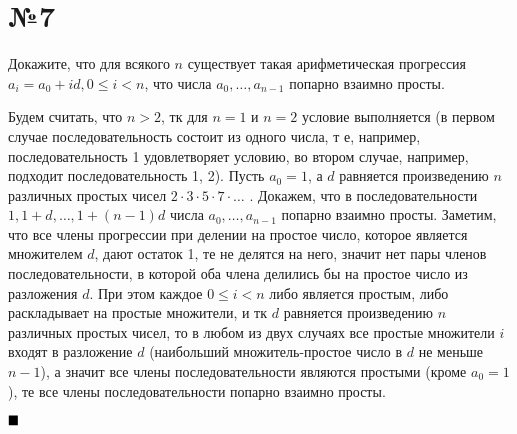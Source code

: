 \documentclass[a4paper, 16pt]{article}
\newenvironment{proof}[1][Доказательство]{%
	\begin{trivlist}
		\item[\hskip \labelsep {\bfseries #1:}]
		\item \hspace{14pt}
	}{
		$ \hfill\blacksquare $
	\end{trivlist}
	\hfill\break
}
\begin{document}
	\section*{№7}
	
		Докажите, что для всякого
		$n$
		существует такая арифметическая прогрессия
		$a_i = a_0 + id, 0 \leq i < n$,
		что числа
		$a_0, \dots, a_{n-1}$
		попарно взаимно просты.
		
		\begin{proof}
			Будем считать, что $n > 2$, тк для $n = 1$ и $n = 2$ условие выполняется (в первом случае последовательность состоит из одного числа, т е, например, последовательность {1} удовлетворяет условию, во втором случае, например, подходит последовательность {1, 2}). Пусть $a_0 = 1$, а $d$ равняется произведению $n$ различных простых чисел $2 \cdot 3 \cdot 5 \cdot 7 \cdot \dots$ . Докажем, что в последовательности $1, 1 + d, \dots, 1 + (n-1)d$ числа
			$a_0, \dots, a_{n-1}$
			попарно взаимно просты. Заметим, что все члены прогрессии при делении на простое число, которое является множителем $d$, дают остаток 1, те не делятся на него, значит нет пары членов последовательности, в которой оба члена делились бы на простое число из разложения $d$. При этом каждое $0 \leq i < n$ либо является простым, либо раскладывает на простые множители, и тк $d$ равняется произведению $n$ различных простых чисел, то в любом из двух случаях все простые множители $i$ входят в разложение $d$ (наибольший множитель-простое число в $d$ не меньше $n - 1$), а значит все члены последовательности являются простыми (кроме $a_0 = 1$), те все члены последовательности попарно взаимно просты.
		\end{proof}
		
	
	
	
	
	
	
\end{document}
